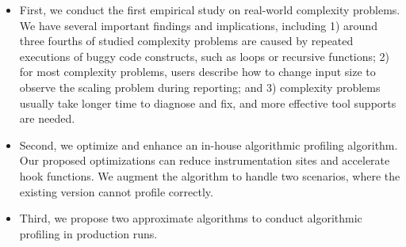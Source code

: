\begin{itemize}

\item First, we conduct the first empirical study on real-world complexity problems. 
We have several important findings and implications, including
1) around three fourths of studied complexity problems are 
caused by repeated executions of buggy code constructs,
such as loops or recursive functions;
2) for most complexity problems, 
users describe how to change input size to observe the scaling problem during reporting;
and 3) complexity problems usually take longer time to diagnose and fix, 
and more effective tool supports are needed.  

\item Second, we optimize and enhance an in-house algorithmic profiling algorithm.
Our proposed optimizations 
can reduce instrumentation sites and accelerate hook functions.
We augment the algorithm to handle two scenarios, 
where the existing version cannot profile correctly. 





\item Third, we propose two approximate algorithms to conduct algorithmic profiling in production runs. 

\end{itemize}

